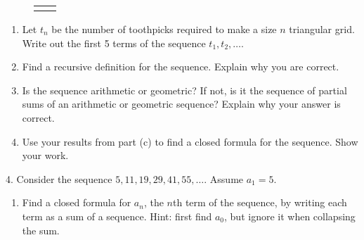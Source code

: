 \documentclass[10pt,]{book}
\theoremstyle{plain}
\theoremstyle{definition}
\theoremstyle{definition}
\theoremstyle{definition}
\numberwithin{equation}{chapter}
\newlength{\panelmax}
\begin{document}
\begin{exerciselist}
{{{{\begin{tikzpicture}[scale=.8]
\end{tikzpicture}
}
}}
\newlength{\phAVimage}\setlength{\phAVimage}{\ht\panelboxAVimage+\dp\panelboxAVimage}
\settototalheight{\phAVimage}{\usebox{\panelboxAVimage}}
\setlength{\panelmax}{\maxof{\panelmax}{\phAVimage}}
\leavevmode%
\setlength{\tabcolsep}{0.125\textwidth}
\begin{figure}
\hspace*{0.125\textwidth}%
\begin{tabular}{@{}*{2}{c}@{}}
\begin{minipage}[c][\panelmax][b]{0.2\textwidth}\usebox{\panelboxAUimage}\end{minipage}&
\begin{minipage}[c][\panelmax][b]{0.3\textwidth}\usebox{\panelboxAVimage}\end{minipage}\end{tabular}
\end{figure}
}%
\leavevmode%
\begin{enumerate}[label=(\alph*)]
\item\hypertarget{li-1021}{}
                Let \(t_n\) be the number of toothpicks required to make a size \(n\) triangular grid. Write out the first 5 terms of the sequence \(t_1, t_2, \ldots\).


\item\hypertarget{li-1022}{}
                Find a recursive definition for the sequence. Explain why you are correct.


\item\hypertarget{li-1023}{}
                Is the sequence arithmetic or geometric? If not, is it the sequence of partial sums of an arithmetic or geometric sequence? Explain why your answer is correct.



\item\hypertarget{li-1024}{}
                Use your results from part (c) to find a closed formula for the sequence. Show your work.


\end{enumerate}
\par\smallskip
\item[4.]\hypertarget{exercise-208}{}
            Consider the sequence \(5, 11, 19, 29, 41, 55,\ldots\). Assume \(a_1 = 5\).
\leavevmode%
\begin{enumerate}[label=(\alph*)]
\item\hypertarget{li-1025}{}
                Find a closed formula for \(a_n\), the \(n\)th term of the sequence, by writing each term as a sum of a sequence. Hint: first find \(a_0\), but ignore it when collapsing the sum.



\end{enumerate}
\end{exerciselist}
\end{document}
